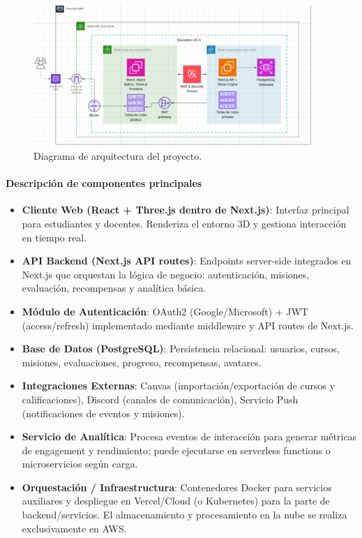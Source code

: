 \begin{figure}[H]
	\centering
	\includegraphics[width=0.95\textwidth]{images/arquitectura.png}
	\caption{Diagrama de arquitectura del proyecto.}
	\label{fig:arquitectura}
\end{figure}

\paragraph{Descripción de componentes principales}
\begin{itemize}
	\item \textbf{Cliente Web (React + Three.js dentro de Next.js)}: Interfaz principal para estudiantes y docentes. Renderiza el entorno 3D y gestiona interacción en tiempo real.
	\item \textbf{API Backend (Next.js API routes)}: Endpoints server-side integrados en Next.js que orquestan la lógica de negocio: autenticación, misiones, evaluación, recompensas y analítica básica.
	\item \textbf{Módulo de Autenticación}: OAuth2 (Google/Microsoft) + JWT (access/refresh) implementado mediante middleware y API routes de Next.js.
	\item \textbf{Base de Datos (PostgreSQL)}: Persistencia relacional: usuarios, cursos, misiones, evaluaciones, progreso, recompensas, avatares.
	\item \textbf{Integraciones Externas}: Canvas (importación/exportación de cursos y calificaciones), Discord (canales de comunicación), Servicio Push (notificaciones de eventos y misiones).
	\item \textbf{Servicio de Analítica}: Procesa eventos de interacción para generar métricas de engagement y rendimiento; puede ejecutarse en serverless functions o microservicios según carga.
	\item \textbf{Orquestación / Infraestructura}: Contenedores Docker para servicios auxiliares y despliegue en Vercel/Cloud (o Kubernetes) para la parte de backend/servicios. El almacenamiento y procesamiento en la nube se realiza exclusivamente en AWS.
\end{itemize}

